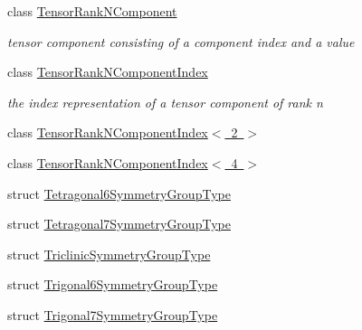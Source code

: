 \begin{DoxyCompactItemize}
class \mbox{\hyperlink{classmpc_1_1core_1_1_tensor_rank_n_component}{Tensor\+Rank\+N\+Component}}
\begin{DoxyCompactList}\small\item\em tensor component consisting of a component index and a value \end{DoxyCompactList}\item 
class \mbox{\hyperlink{classmpc_1_1core_1_1_tensor_rank_n_component_index}{Tensor\+Rank\+N\+Component\+Index}}
\begin{DoxyCompactList}\small\item\em the index representation of a tensor component of rank n \end{DoxyCompactList}\item 
class \mbox{\hyperlink{classmpc_1_1core_1_1_tensor_rank_n_component_index_3_012_01_4}{Tensor\+Rank\+N\+Component\+Index$<$ 2 $>$}}
\item 
class \mbox{\hyperlink{classmpc_1_1core_1_1_tensor_rank_n_component_index_3_014_01_4}{Tensor\+Rank\+N\+Component\+Index$<$ 4 $>$}}
\item 
struct \mbox{\hyperlink{structmpc_1_1core_1_1_tetragonal6_symmetry_group_type}{Tetragonal6\+Symmetry\+Group\+Type}}
\item 
struct \mbox{\hyperlink{structmpc_1_1core_1_1_tetragonal7_symmetry_group_type}{Tetragonal7\+Symmetry\+Group\+Type}}
\item 
struct \mbox{\hyperlink{structmpc_1_1core_1_1_triclinic_symmetry_group_type}{Triclinic\+Symmetry\+Group\+Type}}
\item 
struct \mbox{\hyperlink{structmpc_1_1core_1_1_trigonal6_symmetry_group_type}{Trigonal6\+Symmetry\+Group\+Type}}
\item 
struct \mbox{\hyperlink{structmpc_1_1core_1_1_trigonal7_symmetry_group_type}{Trigonal7\+Symmetry\+Group\+Type}}
\end{DoxyCompactItemize}
